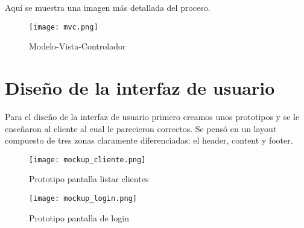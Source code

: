 Aquí se muestra una imagen más detallada del proceso.

\begin{figure}[!htb]
  \centering
    \texttt{[image: mvc.png]}
  \caption{Modelo-Vista-Controlador}
  \label{a}
\end{figure}

\section{Diseño de la interfaz de usuario} 

Para el diseño de la interfaz de usuario primero creamos unos prototipos y se le enseñaron al cliente al cual le parecieron correctos. Se pensó en un layout compuesto de tres zonas claramente diferenciadas: el header, content y footer.

\begin{figure}[!htb]
  \centering
    \texttt{[image: mockup\_cliente.png]}
  \caption{Prototipo pantalla listar clientes}
  \label{a}
\end{figure}

\begin{figure}[!htb]
  \centering
    \texttt{[image: mockup\_login.png]}
  \caption{Prototipo pantalla de login}
  \label{a}
\end{figure}

\newpage
